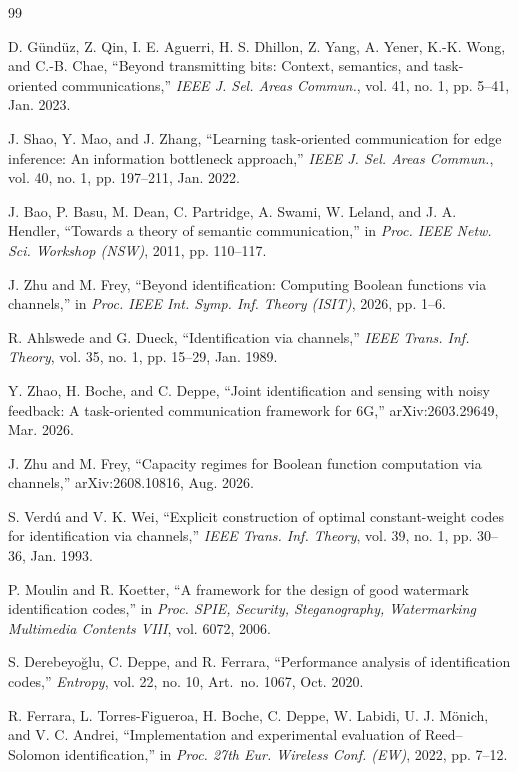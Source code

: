 \begin{thebibliography}{99}





D. G\"und\"uz, Z. Qin, I. E. Aguerri, H. S. Dhillon, Z. Yang, A. Yener, K.-K. Wong, and C.-B. Chae, ``Beyond transmitting bits: Context, semantics, and task-oriented communications,'' \emph{IEEE J. Sel. Areas Commun.}, vol. 41, no. 1, pp. 5--41, Jan. 2023.

J. Shao, Y. Mao, and J. Zhang, ``Learning task-oriented communication for edge inference: An information bottleneck approach,'' \emph{IEEE J. Sel. Areas Commun.}, vol. 40, no. 1, pp. 197--211, Jan. 2022.

J. Bao, P. Basu, M. Dean, C. Partridge, A. Swami, W. Leland, and J. A. Hendler, ``Towards a theory of semantic communication,'' in \emph{Proc. IEEE Netw. Sci. Workshop (NSW)}, 2011, pp. 110--117.

J. Zhu and M. Frey, ``Beyond identification: Computing Boolean functions via channels,'' in \emph{Proc. IEEE Int. Symp. Inf. Theory (ISIT)}, 2026, pp. 1--6.

R. Ahlswede and G. Dueck, ``Identification via channels,'' \emph{IEEE Trans. Inf. Theory}, vol. 35, no. 1, pp. 15--29, Jan. 1989.

Y. Zhao, H. Boche, and C. Deppe, ``Joint identification and sensing with noisy feedback: A task-oriented communication framework for 6G,'' arXiv:2603.29649, Mar. 2026.

J. Zhu and M. Frey, ``Capacity regimes for Boolean function computation via channels,'' arXiv:2608.10816, Aug. 2026.

S. Verd\'u and V. K. Wei, ``Explicit construction of optimal constant-weight codes for identification via channels,'' \emph{IEEE Trans. Inf. Theory}, vol. 39, no. 1, pp. 30--36, Jan. 1993.

P. Moulin and R. Koetter, ``A framework for the design of good watermark identification codes,'' in \emph{Proc. SPIE, Security, Steganography, Watermarking Multimedia Contents VIII}, vol. 6072, 2006.

S. Derebeyo\u{g}lu, C. Deppe, and R. Ferrara, ``Performance analysis of identification codes,'' \emph{Entropy}, vol. 22, no. 10, Art.\ no. 1067, Oct. 2020.

R. Ferrara, L. Torres-Figueroa, H. Boche, C. Deppe, W. Labidi, U. J. M\"onich, and V. C. Andrei, ``Implementation and experimental evaluation of Reed--Solomon identification,'' in \emph{Proc. 27th Eur. Wireless Conf. (EW)}, 2022, pp. 7--12.


\end{thebibliography}
